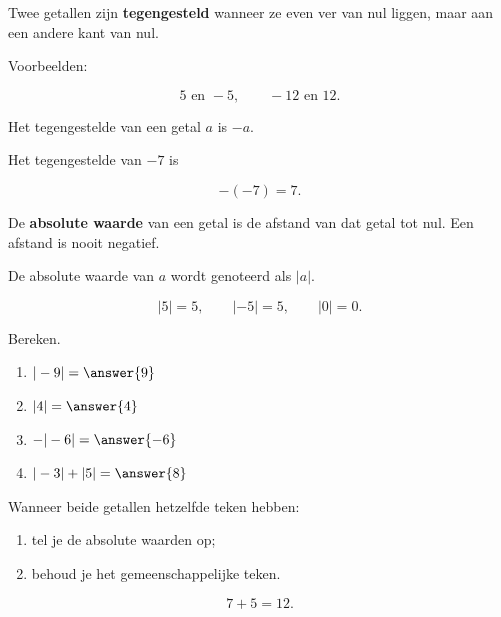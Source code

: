 \documentclass{ximera}
\begin{document}

Twee getallen zijn \textbf{tegengesteld} wanneer ze even ver van nul liggen,
maar aan een andere kant van nul.

Voorbeelden:

\[
5 \text{ en } -5,
\qquad
-12 \text{ en } 12.
\]

Het tegengestelde van een getal $a$ is $-a$.

\begin{example}
Het tegengestelde van $-7$ is

\[
-(-7)=7.
\]
\end{example}

De \textbf{absolute waarde} van een getal is de afstand van dat getal tot nul.
Een afstand is nooit negatief.

De absolute waarde van $a$ wordt genoteerd als $|a|$.

\[
|5|=5,
\qquad
|-5|=5,
\qquad
|0|=0.
\]

\begin{exercise}
Bereken.

\begin{enumerate}
    \item $|-9|=\answer{9}$
    \item $|4|=\answer{4}$
    \item $-|-6|=\answer{-6}$
    \item $|-3|+|5|=\answer{8}$
\end{enumerate}
\end{exercise}



Wanneer beide getallen hetzelfde teken hebben:

\begin{enumerate}
    \item tel je de absolute waarden op;
    \item behoud je het gemeenschappelijke teken.
\end{enumerate}

\begin{example}
\[
7+5=12.
\]
\end{example}
\end{document}
